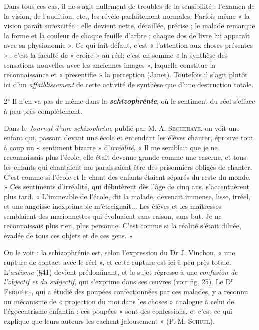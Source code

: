 Dans tous ces cas, il ne s’agit nullement de troubles de la sensibilité :
l'examen de la vision, de l’audition, etc., les révèle parfaitement
normales. Parfois même « la vision paraît surexcitée ; elle
devient nette, détaillée, précise ; le malade remarque la forme et la
couleur de chaque feuille d’arbre ; chaque dos de livre lui apparaît
avec sa physionomie ». Ce qui fait défaut, c’est « l’attention aux choses
présentes » ; c’est la faculté de « croire » au réel; c’est en somme « la
synthèse des sensations nouvelles avec les anciennes images », laquelle
constitue la reconnaissance et « présentifie » la perception (Janet).
Toutefois il s’agit plutôt ici d’un {\it affaiblissement} de cette activité
de synthèse que d’une destruction totale.

2° Il n’en va pas de même dans la \textbf{\textit {schizophrénie}}, où le sentiment
du réel s’efface à peu près complètement.

\vspace{0.24cm}
{\footnotesize 
Dans le {\it Journal d'une schizophrène} publié par M.-A. \textsc{Sechehaye}, on voit
une enfant qui, passant devant une école et entendant les élèves chanter,
éprouve tout à coup un « sentiment bizarre » d’{\it irréalité}. « Il me semblait
que je ne reconnaissais plus l’école, elle était devenue grande comme une
caserne, et tous les enfants qui chantaient me paraissaient être des prisonniers
obligés de chanter. C'est comme si l’école et le chant des enfants
étaient séparés du reste du monde. » Ces sentiments d’irréalité, qui débutèrent
dès l’âge de cinq ans, s’accentuèrent plus tard. « L'immeuble de
l'école, dit la malade, devenait immense, lisse, irréel, et une angoisse inexprimable
m'étreignait... Les élèves et les maîtresses semblaient des marionnettes
qui évoluaient sans raison, sans but. Je ne reconnaissais plus rien,
plus personne. C’est comme si la réalité s'était diluée, évadée de tous ces
objets et de ces gens. »}
\vspace{0.31cm}

On le voit : la schizophrénie est, selon l’expression du Dr J. Vinchon,
« une rupture de contact avec le réel », et cette rupture est ici
à peu près totale. L’{\it autisme} (\S 41) devient prédominant, et le sujet
régresse à une {\it confusion de l'objectif et du subjectif}, qui s'exprime dans
ses œuvres (voir fig. 25). Le D$^\text{r}$ \textsc{Ferdière}, qui a étudié des poupées
confectionnées par ces malades, y a reconnu un mécanisme de « projection
du moi dans les choses » analogue à celui de l’égocentrisme
enfantin : ces poupées « sont des confessions, et c’est ce qui explique que
leurs auteurs les cachent jalousement » (P.-M. \textsc{Schuhl}).

